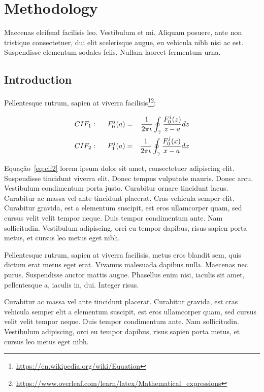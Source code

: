 \chapter{Methodology} \label{chap:ch3}

Maecenas eleifend facilisis leo. Vestibulum et
mi. Aliquam posuere, ante non tristique consectetuer, dui elit
scelerisque augue, eu vehicula nibh nisi ac est. 
Suspendisse elementum sodales felis. Nullam laoreet fermentum urna. 

\section{Introduction}

Pellentesque rutrum, sapien at viverra 
facilisis\footnote{\url{https://en.wikipedia.org/wiki/Equation}}\footnote{\url{https://www.overleaf.com/learn/latex/Mathematical_expressions}}:

\begin{eqnarray}
CIF_1: \hspace*{5mm}F_0^j(a) &=& \frac{1}{2\pi \iota} \oint_{\gamma} \frac{F_0^j(z)}{z - a} dz \label{eq:cif1} \\
CIF_2: \hspace*{5mm}F_1^j(a) &=& \frac{1}{2\pi \iota} \oint_{\gamma} \frac{F_0^j(x)}{x - a} dx \label{eq:cif2}
\end{eqnarray}

Equação~\ref{eq:cif2} lorem ipsum dolor sit amet, consectetuer
adipiscing elit. Suspendisse tincidunt viverra elit. Donec tempus
vulputate mauris. Donec arcu. Vestibulum condimentum porta
justo. Curabitur ornare tincidunt lacus. Curabitur ac massa vel ante
tincidunt placerat. Cras vehicula semper elit. Curabitur gravida, est
a elementum suscipit, est eros ullamcorper quam, sed cursus velit
velit tempor neque. Duis tempor condimentum ante. Nam
sollicitudin. Vestibulum adipiscing, orci eu tempor dapibus, risus
sapien porta metus, et cursus leo metus eget nibh. 

Pellentesque rutrum, sapien at viverra facilisis, metus eros blandit
sem, quis dictum erat metus eget erat. Vivamus malesuada dapibus
nulla. Maecenas nec purus. Suspendisse auctor mattis augue. Phasellus
enim nisi, iaculis sit amet, pellentesque a, iaculis in, dui. Integer
risus. 

Curabitur ac massa vel ante tincidunt placerat. 
Curabitur gravida, est cras vehicula semper elit
a elementum suscipit, est eros ullamcorper quam, sed cursus velit
velit tempor neque. Duis tempor condimentum ante. Nam
sollicitudin. Vestibulum adipiscing, orci eu tempor dapibus, risus
sapien porta metus, et cursus leo metus eget nibh.

